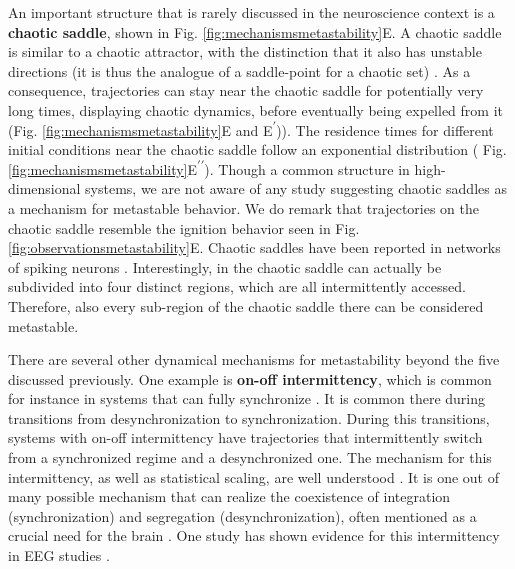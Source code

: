 \documentclass[reprint,onecolumn,superscriptaddress,showpacs,amsmath,amssymb,aps,floatfix]{revtex4-2}
\theoremstyle{definition}
\newcommand{\Emph}[1]{\textbf{#1}}
\newcommand*{\everymodeprime}{\ensuremath{\prime}}
\begin{document}
An important structure that is rarely discussed in the neuroscience context is a \Emph{chaotic saddle}, shown in  Fig. \ref{fig:mechanismsmetastability}E. A chaotic saddle is similar to a chaotic attractor, with the distinction that it also has unstable directions (it is thus the analogue of a saddle-point for a chaotic set) \cite{lai2009transient}. As a consequence, trajectories can stay near the chaotic saddle for potentially very long times, displaying chaotic dynamics, before eventually being expelled from it \cite{yorke1979metastable} (Fig. \ref{fig:mechanismsmetastability}E and E\textsuperscript{\everymodeprime})). The residence times for different initial conditions near the chaotic saddle follow an exponential distribution \cite{grebogi1983crises} ( Fig. \ref{fig:mechanismsmetastability}E\textsuperscript{\everymodeprime\everymodeprime}). Though a common structure in high-dimensional systems, we are not aware of any study suggesting chaotic saddles as a mechanism for metastable behavior. We do remark that trajectories on the chaotic saddle resemble the ignition behavior seen in Fig. \ref{fig:observationsmetastability}E. 
Chaotic saddles have been reported in networks of spiking neurons \cite{ansmann2016selfinduced}. Interestingly, in \cite{ansmann2016selfinduced} the chaotic saddle can actually be subdivided into four distinct regions, which are all intermittently accessed. Therefore, also every sub-region of the chaotic saddle there can be considered metastable. 

There are several other dynamical mechanisms for metastability beyond the five discussed previously. One example is \Emph{on-off intermittency}, which is common for instance in systems that can fully synchronize \cite{ashwin1994bubbling, ott1994blowout, saha2017extreme}. It is common there during transitions from desynchronization to synchronization. During this transitions, systems with on-off intermittency have trajectories that intermittently switch from a synchronized regime and a desynchronized one. The mechanism for this intermittency, as well as statistical scaling, are well understood \cite{platt1993onoff, heagy1994characterization, hammer1994experimental}. It is one out of many possible mechanism that can realize the coexistence of integration (synchronization) and segregation (desynchronization), often mentioned as a crucial need for the brain \cite{fingelkurts2001operational, tognoli2014metastable, tognoli2014enlarging, deco2015rethinking}. One study has shown evidence for this intermittency in EEG studies \cite{hramov2006onoff}.
\end{document}
